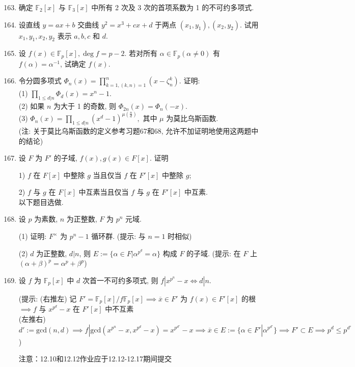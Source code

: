 \documentclass[a4paper,12pt]{article}
\begin{document}
\begin{enumerate}\setcounter{enumi}{162}

\item 确定 \( \mathbb{F}_2[x] \) 与 \( \mathbb{F}_3[x] \) 中所有 2 次及 3 次的首项系数为 1 的不可约多项式.

\item 设直线 \( y = ax + b \) 交曲线 \( y^2 = x^3 + cx + d \) 于两点 \( (x_1, y_1), (x_2, y_2) \). 试用 \( x_1, y_1, x_2, y_2 \) 表示 \( a, b, c \) 和 \( d \). 


\item 设 \( f(x) \in \mathbb{F}_p[x], \deg f = p - 2 \). 若对所有 \( \alpha \in \mathbb{F}_p (\alpha \neq 0) \) 有 \( f(\alpha) = \alpha^{-1} \), 试确定 \( f(x) \). 

\item 
令分圆多项式 \( \Phi_n(x) = \prod_{k=1, (k,n)=1}^{n} (x - \zeta_n^k) \). 证明:\\
(1) \( \prod_{1 \leq d | n} \Phi_d(x) = x^n - 1. \)\\
(2) 如果 \( n \) 为大于 1 的奇数, 则 \( \Phi_{2n}(x) = \Phi_n(-x) \). \\
(3) \( \Phi_n(x) = \prod_{1 \leq d | n} (x^d - 1)^{\mu(\frac{n}{d})}, \) 其中 \( \mu \) 为莫比乌斯函数. \\
(注: 关于莫比乌斯函数的定义参考习题67和68, 允许不加证明地使用这两题中的结论)

\item 设 \( F \) 为 \( F' \) 的子域, \( f(x), g(x) \in F[x] \). 证明

1) $f$ 在 \( F[x] \) 中整除 $g$ 当且仅当 $f$ 在 \( F'[x] \) 中整除 $g$;

2) $f$ 与 $g$ 在 \( F[x] \) 中互素当且仅当 $f$ 与 $g$ 在 \( F'[x] \) 中互素.\\

{\color{red} 以下题目选做.}

\item 设 $p$ 为素数, $n$ 为正整数, \( F \) 为 \( p^n \) 元域.
\par (1) 证明:  \( F^{\times} \) 为 \( p^n-1 \) 循环群. (提示: 与 $n=1$ 时相似)
    \par (2) $d$ 为正整数, \( d|n \), 则 \( E := \{\alpha \in F | \alpha^{p^d} = \alpha\} \)  构成 $F$ 的子域. (提示: 在 \( F \) 上 \( (\alpha+\beta)^p = \alpha^p+\beta^p \))

\item 设 \( f \) 为 \( \mathbb{F}_p[x] \) 中 \( d \) 次首一不可约多项式, 则 $f|x^{p^n}-x\iff d|n$.

(提示: (右推左) 记 \( F' = \mathbb{F}_p[x]/f\mathbb{F}_p[x] \implies \overline{x} \in F' \) 为 \(f(x) \in F'[x] \) 的根 $\implies f$ 与 \( x^{p^d}-x \) 在 \( F'[x] \) 中不互素\\

(左推右) $ d' := \text{gcd}(n, d) \implies f|\text{gcd}(x^{p^n}-x, x^{p^d}-x) = x^{p^{d'}}-x \implies \overline{x}\in E:=\{\alpha\in F'|\alpha^{p^{d'}}\}\implies  F' \subset E \implies p^d\leq p^{d'}$ )

{\color{red} 注意：12.10和12.12作业应于12.12-12.17期间提交}

\end{enumerate}
\end{document}
